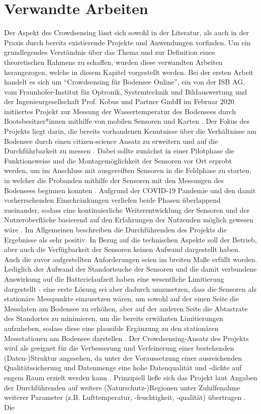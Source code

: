 \section{Verwandte Arbeiten}
Der Aspekt des Crowdsensing lässt sich sowohl in der Literatur, als auch in der Praxis durch bereits existierende Projekte und Anwendungen vorfinden. Um ein grundlegendes Verständnis über das Thema und zur Definition eines theoretischen Rahmens zu schaffen, wurden diese verwandten Arbeiten herangezogen, welche in diesem Kapitel vorgestellt werden. \newline Bei der ersten Arbeit handelt es sich um \enquote{Crowdsensing für Bodensee Online}, ein von der ISB AG, vom Fraunhofer-Institut für Optronik, Systemtechnik und Bildauswertung und der Ingenieurgesellschaft Prof. Kobus und Partner GmbH im Februar 2020 initiiertes Projekt zur Messung der Wassertemperatur des Bodensees durch Bootsbesitzer*innen mithilfe von mobilen Sensoren und Karten \cite {Ministerium2021}. Der Fokus des Projekts liegt darin, die bereits vorhandenen Kenntnisse über die Verhältnisse am Bodensee durch einen citizen-science Ansatz zu erweitern und auf die Durchführbarkeit zu messen \cite{Bodensee2021}. Dabei sollte zunächst in einer Pilotphase die Funktionsweise und die Montagemöglichkeit der Sensoren vor Ort erprobt werden, um im Anschluss mit ausgereiften Sensoren in die Feldphase zu starten, in welcher die Probanden mithilfe der Sensoren mit den Messungen des Bodensees beginnen konnten \cite{Bodensee2021}. Aufgrund der COVID-19 Pandemie und den damit vorherrschenden Einschränkungen verliefen beide Phasen überlappend zueinander, sodass eine kontinuierliche Weiterentwicklung der Sensoren und der Nutzeroberfläche basierend auf den Erfahrungen der Nutzenden möglich gewesen wäre \cite{Bodensee2021}. Im Allgemeinen beschreiben die Durchführenden des Projekts die Ergebnisse als sehr positiv. \newline In Bezug auf die technischen Aspekte soll der Betrieb, aber auch die Verfügbarkeit der Sensoren keinen Aufwand dargestellt haben. Auch die zuvor aufgestellten Anforderungen seien im breiten Maße erfüllt worden. Lediglich der Aufwand der Standortsuche der Sensoren und die damit verbundene Auswirkung auf die Batterielaufzeit haben eine wesentliche Limitierung dargestellt - eine erste Lösung sei aber dadurch umzusetzen, dass die Sensoren als stationäre Messpunkte einzusetzen wären, um sowohl auf der einen Seite die Messdaten am Bodensee zu erhöhen, aber auf der anderen Seite die Abtastrate des Standortes zu minimieren, um die bereits erwähnten Limitierungen aufzuheben, sodass diese eine plausible Ergänzung zu den stationären Messstationen am Bodensee darstellen \cite{Bodensee2021}. Der Crowdsensing-Ansatz des Projekts wird als geeignet für die Verbesserung und Verfeinerung einer bestehenden (Daten-)Struktur angesehen, da unter der Voraussetzung einer ausreichenden Qualitätssicherung und Datenmenge eine hohe Datenqualität und -dichte auf engem Raum erzielt werden kann \cite{Bodensee2021}. Prinzipiell ließe sich das Projekt laut Angaben der Durchführenden auf weitere (Naturschutz-)Regionen unter Zuhilfenahme weiterer Parameter (z.B. Lufttemperatur, -feuchtigkeit, -qualität) übertragen \cite{Bodensee2021}. Die 